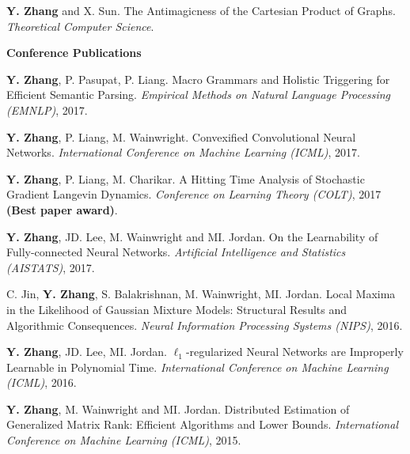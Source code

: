 \documentclass{res} %
\begin{document}
\begin{resume}
\begin{enumerate}[label={[J\arabic*]}, ref={J\arabic*}]
\item \textbf{Y. Zhang} and X. Sun. The Antimagicness of the Cartesian Product of Graphs.
\emph{Theoretical Computer Science}.\label{the-antimagicness-tcs}
\end{enumerate}

{\bf\Large Conference Publications}
\vspace{5pt}

\begin{enumerate}[label={[C\arabic*]}, ref={C\arabic*}]

\item  \textbf{Y. Zhang}, P. Pasupat, P. Liang. Macro Grammars and Holistic Triggering for Efficient Semantic Parsing.
\emph{Empirical Methods on Natural Language Processing (EMNLP)}, 2017. \label{macro-emnlp17}

\item  \textbf{Y. Zhang}, P. Liang, M. Wainwright. Convexified Convolutional Neural Networks.
\emph{International Conference on Machine Learning (ICML)}, 2017. \label{convexified-icml17}

\item  \textbf{Y. Zhang}, P. Liang, M. Charikar. A Hitting Time Analysis of Stochastic Gradient Langevin Dynamics.
\emph{Conference on Learning Theory (COLT)}, 2017 {\bf (Best paper award)}. \label{a-hitting-colt17}

\item \textbf{Y. Zhang}, JD. Lee, M. Wainwright and MI. Jordan. On the Learnability of Fully-connected Neural Networks.
\emph{Artificial Intelligence and Statistics (AISTATS)}, 2017. \label{on-the-learnability-aistats17}

\item C. Jin, {\bf Y. Zhang}, S. Balakrishnan, M. Wainwright, MI. Jordan.  
Local Maxima in the Likelihood of Gaussian Mixture Models: Structural Results and Algorithmic Consequences.
\emph{Neural Information Processing Systems (NIPS)}, 2016. \label{local-nips16}

\item \textbf{Y. Zhang}, JD. Lee, MI. Jordan. $\ell_1$-regularized Neural Networks are Improperly Learnable in Polynomial Time.
\emph{International Conference on Machine Learning (ICML)}, 2016. \label{l1-icml16}

\item \textbf{Y. Zhang}, M. Wainwright and MI. Jordan. Distributed Estimation of Generalized Matrix Rank: Efficient Algorithms and Lower Bounds.
\emph{International Conference on Machine Learning (ICML)}, 2015. \label{distributed-icml15}


\end{enumerate}
\end{resume}
\end{document}
